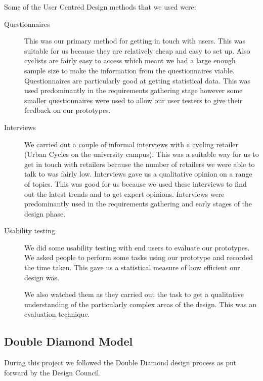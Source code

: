 \documentclass[a4paper]{report}
\begin{document}
Some of the User Centred Design methods that we used were:
\begin{description}
  \item[Questionnaires] This was our primary method for getting in touch with users. This was suitable for us because they are relatively cheap and easy to set up. Also cyclists are fairly easy to access which meant we had a large enough sample size to make the information from the questionnaires viable. Questionnaires are particularly good at getting statistical data. This was used predominantly in the requirements gathering stage however some smaller questionnaires were used to allow our user testers to give their feedback on our prototypes.
  \item[Interviews] We carried out a couple of informal interviews with a cycling retailer (Urban Cycles on the university campus). This was a suitable way for us to get in touch with retailers because the number of retailers we were able to talk to was fairly low. 
  Interviews gave us a qualitative opinion on a range of topics. This was good for us because we used these interviews to find out the latest trends and to get expert opinions. Interviews were predominantly used in the requirements gathering and early stages of the design phase.
  \item[Usability testing] We did some usability testing with end users to evaluate our prototypes. We asked people to perform some tasks using our prototype and recorded the time taken. This gave us a statistical measure of how efficient our design was. 
  
  We also watched them as they carried out the task to get a qualitative understanding of the particularly complex areas of the design. This was an evaluation technique.
\end{description}

\subsection{Double Diamond Model}
During this project we followed the Double Diamond design process as put forward by the Design Council\cite{doublediamond}. 
\end{document}
